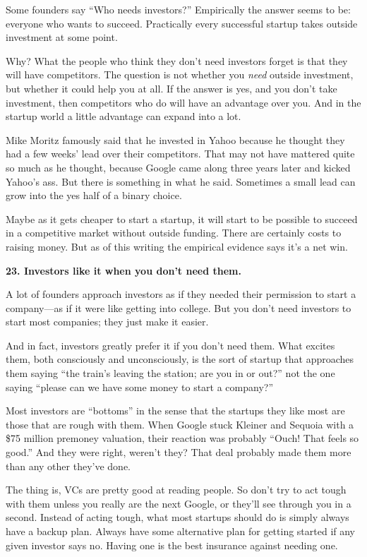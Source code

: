 Some founders say ``Who needs investors?'' Empirically the answer seems
to be: everyone who wants to succeed. Practically every successful
startup takes outside investment at some point.

Why? What the people who think they don't need investors forget is that
they will have competitors. The question is not whether you \emph{need}
outside investment, but whether it could help you at all. If the answer
is yes, and you don't take investment, then competitors who do will have
an advantage over you. And in the startup world a little advantage can
expand into a lot.

Mike Moritz famously said that he invested in Yahoo because he thought
they had a few weeks' lead over their competitors. That may not have
mattered quite so much as he thought, because Google came along three
years later and kicked Yahoo's ass. But there is something in what he
said. Sometimes a small lead can grow into the yes half of a binary
choice.

Maybe as it gets cheaper to start a startup, it will start to be
possible to succeed in a competitive market without outside funding.
There are certainly costs to raising money. But as of this writing the
empirical evidence says it's a net win.

\textbf{23. Investors like it when you don't need them.}

A lot of founders approach investors as if they needed their permission
to start a company---as if it were like getting into college. But you
don't need investors to start most companies; they just make it easier.

And in fact, investors greatly prefer it if you don't need them. What
excites them, both consciously and unconsciously, is the sort of startup
that approaches them saying ``the train's leaving the station; are you
in or out?'' not the one saying ``please can we have some money to start
a company?''

Most investors are ``bottoms'' in the sense that the startups they like
most are those that are rough with them. When Google stuck Kleiner and
Sequoia with a \$75 million premoney valuation, their reaction was
probably ``Ouch! That feels so good.'' And they were right, weren't
they? That deal probably made them more than any other they've done.

The thing is, VCs are pretty good at reading people. So don't try to act
tough with them unless you really are the next Google, or they'll see
through you in a second. Instead of acting tough, what most startups
should do is simply always have a backup plan. Always have some
alternative plan for getting started if any given investor says no.
Having one is the best insurance against needing one.

